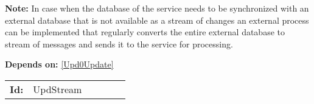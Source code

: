 \textbf{Note:} In case when the database of the service needs to be synchronized with an external database that is not available as a stream of changes an external process can be implemented that regularly converts the entire  external database to stream of messages and sends it to the service for processing.

\textbf{Depends on:} \ref{Upd0Update} 

\par
{\small \begin{center}\begin{tabular}{rlrlrl}
\textbf{Id:} & UpdStream  & & & \end{tabular}\end{center} }

